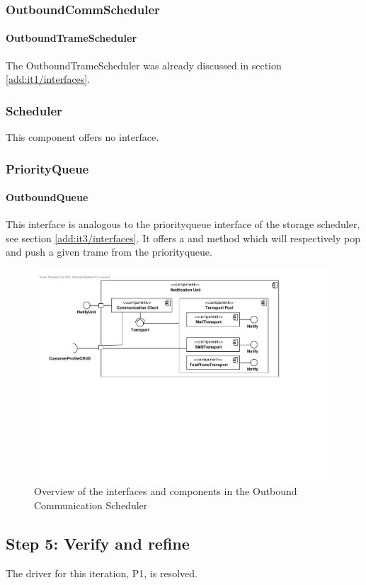 \subsubsection{OutboundCommScheduler}

\paragraph{OutboundTrameScheduler}

\npar The OutboundTrameScheduler was already discussed in section
\ref{add:it1/interfaces}.

\subsubsection{Scheduler}

\npar This component offers no interface.

\subsubsection{PriorityQueue}

\paragraph{OutboundQueue}

\npar This interface is analogous to the priorityqueue interface of the storage
scheduler, see section \ref{add:it3/interfaces}. It offers a 
and  method which will respectively pop and push a given
trame from the priorityqueue.

\begin{figure}[H]
	\begin{centering}
		\includegraphics[width=\textwidth]{figs/add-it7-interfaces.pdf}
		\caption{Overview of the interfaces and components in the
		Outbound Communication Scheduler}
		\label{fig:it7/interfaces}
	\end{centering}
\end{figure}

\subsection{Step 5: Verify and refine}
\label{add:it7/verification}

\npar The driver for this iteration, P1, is resolved.